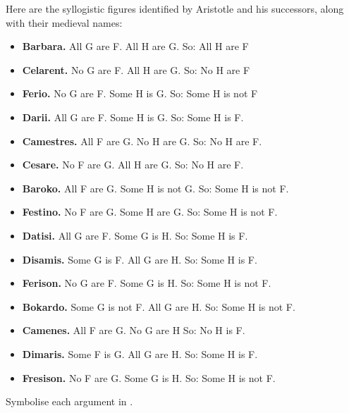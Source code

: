 \practiceproblems
\problempart
\label{pr.BarbaraEtc}
Here are the syllogistic figures identified by Aristotle and his successors, along with their medieval names:
\begin{itemize}
	\item \textbf{Barbara.} All G are F. All H are G. So:  All H are F
	\item \textbf{Celarent.} No G are F. All H are G. So: No H are F
	\item \textbf{Ferio.} No G are F. Some H is G. So: Some H is not F
	\item \textbf{Darii.} All G are F. Some H is G. So: Some H is F.
	\item \textbf{Camestres.} All F are G. No H are G. So: No H are F.
	\item \textbf{Cesare.} No F are G. All H are G. So: No H are F.
	\item \textbf{Baroko.} All F are G. Some H is not G. So: Some H is not F.
	\item \textbf{Festino.} No F are G. Some H are G. So: Some H is not F.
	\item \textbf{Datisi.} All G are F. Some G is H. So: Some H is F.
	\item \textbf{Disamis.} Some G is F. All G are H. So: Some H is F.
	\item \textbf{Ferison.} No G are F. Some G is H. So: Some H is not F.
	\item \textbf{Bokardo.} Some G is not F. All G are H. So:  Some H is not F.
	\item \textbf{Camenes.} All F are G. No G are H So: No H is F.
	\item \textbf{Dimaris.} Some F is G. All G are H. So: Some H is F.
	\item \textbf{Fresison.} No F are G. Some G is H. So: Some H is not F.
\end{itemize}
Symbolise each argument in \FOL.



